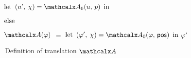 \begin{figure}[t]
\begin{enumerate}
\begin{itemize}
\begin{itemize}
      \itemx[] $\textrm{let}$ $( u',\, \chi ) = \conv_0( u,\, p )$ $\textrm{in}$ 
    \end{itemize}
   \itemx[] $\textrm{else}$
   \begin{itemize}
     \itemx[] \return {}
   \end{itemize}
 \end{itemize}
\end{enumerate}
\begin{enumerate}
\itemx[\ ]
$\conv( \varphi )$ $=$ $\textrm{let}$ $( \varphi',\, \chi ) = \conv_0( \varphi,\, \ppos )$ $\textrm{in}$ $\varphi'$
\\[-1.5\baselineskip] %
\end{enumerate}
\caption{\,Definition of translation $\conv$}
\label{fig:A}
\end{figure}

